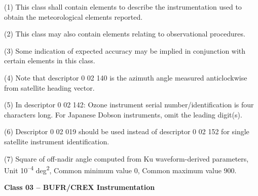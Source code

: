 (1) This class shall contain elements to describe the instrumentation used to obtain the meteorological elements reported.

(2) This class may also contain elements relating to observational procedures.

(3) Some indication of expected accuracy may be implied in conjunction with certain elements in this class.

(4) Note that descriptor 0 02 140 is the azimuth angle measured anticlockwise from satellite heading vector.

(5) In descriptor 0 02 142: Ozone instrument serial number/identification is four characters long. For Japanese Dobson instruments, omit the leading digit(s).

(6) Descriptor 0 02 019 should be used instead of descriptor 0 02 152 for single satellite instrument identification.

(7) Square of off-nadir angle computed from Ku waveform-derived parameters, Unit 10\textsuperscript{--4} deg\textsuperscript{2}, Common minimum value 0, Common maximum value 900.

\textbf{Class 03 -- BUFR/CREX Instrumentation}

